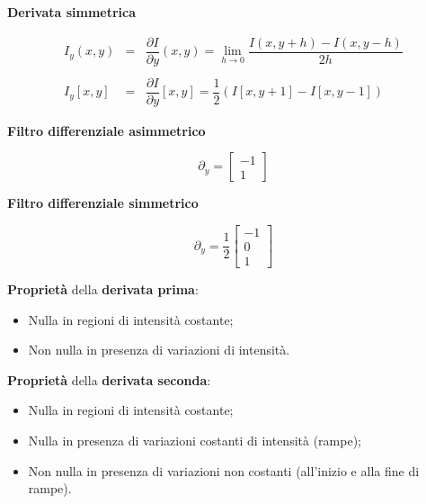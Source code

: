 \documentclass[a4paper]{article}
\begin{document}
	\noindent
	\textcolor{Green4}{\textbf{Derivata simmetrica}}
	
	\begin{equation*}
		\begin{array}{lll}
			I_{y}\left(x,y\right) & = & \dfrac{\partial I}{\partial y}\left(x,y\right) = \lim_{h \rightarrow 0} \dfrac{I\left(x, y+h\right) - I\left(x,y-h\right)}{2h} \\
			&& \\
			I_{y}\left[x,y\right] & = & \dfrac{\partial I}{\partial y}\left[x,y\right] = \dfrac{1}{2} \left(I\left[x, y+1\right] - I\left[x,y-1\right]\right)
		\end{array}
	\end{equation*}
	
	\noindent
	\textcolor{Green4}{\textbf{Filtro differenziale asimmetrico}}
	
	\begin{equation*}
		\partial_{y} = \begin{bmatrix}
			-1 \\
			1
		\end{bmatrix}
	\end{equation*}

	\noindent
	\textcolor{Green4}{\textbf{Filtro differenziale simmetrico}}
	
	\begin{equation*}
		\partial_{y} = \dfrac{1}{2} \begin{bmatrix}
			-1 \\
			0 \\
			1
		\end{bmatrix}
	\end{equation*}
	
	\noindent
	\textbf{Proprietà} della \textbf{derivata prima}:
	
	\begin{itemize}[label=-]
		\item Nulla in regioni di intensità costante;
		\item Non nulla in presenza di variazioni di intensità.
	\end{itemize}
	
	\noindent
	\textbf{Proprietà} della \textbf{derivata seconda}:
	
	\begin{itemize}[label=-]
		\item Nulla in regioni di intensità costante;
		\item Nulla in presenza di variazioni costanti di intensità (rampe);
		\item Non nulla in presenza di variazioni non costanti (all'inizio e alla fine di rampe).
	\end{itemize}
\end{document}

